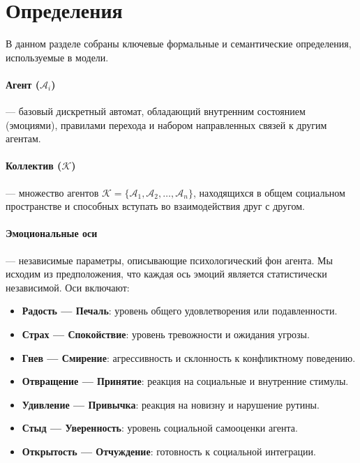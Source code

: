 \documentclass[12pt]{article}
\begin{document}
\clearpage
\section{Определения}

В данном разделе собраны ключевые формальные и семантические определения, используемые в модели.

\paragraph{Агент (\(\mathcal{A}_i\))} — базовый дискретный автомат, обладающий внутренним состоянием (эмоциями), правилами перехода и набором направленных связей к другим агентам.
\paragraph{Коллектив (\(\mathcal{K}\))} — множество агентов \( \mathcal{K} = \{\mathcal{A}_1, \mathcal{A}_2, \ldots, \mathcal{A}_n \} \), находящихся в общем социальном пространстве и способных вступать во взаимодействия друг с другом.

\paragraph{Эмоциональные оси} — независимые параметры, описывающие психологический фон агента. Мы исходим из предположения, что каждая ось эмоций является статистически независимой. Оси включают:
\begin{itemize}
    \item \textbf{Радость — Печаль}: уровень общего удовлетворения или подавленности.
    \item \textbf{Страх — Спокойствие}: уровень тревожности и ожидания угрозы.
    \item \textbf{Гнев — Смирение}: агрессивность и склонность к конфликтному поведению.
    \item \textbf{Отвращение — Принятие}: реакция на социальные и внутренние стимулы.
    \item \textbf{Удивление — Привычка}: реакция на новизну и нарушение рутины.
    \item \textbf{Стыд — Уверенность}: уровень социальной самооценки агента.
    \item \textbf{Открытость — Отчуждение}: готовность к социальной интеграции.
\end{itemize}
\end{document}
